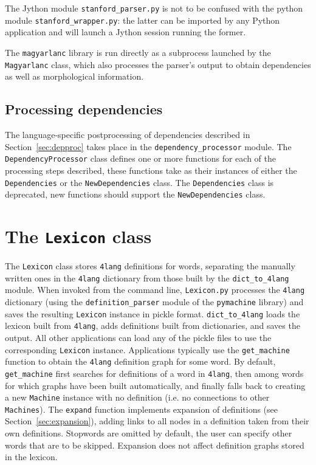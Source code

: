 \documentclass{article}
\newcommand{\difl}{\texttt{dict\_to\_4lang}\xspace}
\newcommand{\fl}{\texttt{4lang}\xspace}
\begin{document}
The Jython module \texttt{stanford\_parser.py}
is not to be confused with the python module \texttt{stanford\_wrapper.py}: the
latter can be imported by any Python application and will launch a Jython
session running the former.

The \texttt{magyarlanc} library is run directly as a subprocess launched by the
\texttt{Magyarlanc} class, which also processes the parser's output to obtain
dependencies as well as morphological information.

\subsection{Processing dependencies}
The language-specific postprocessing of dependencies described in
Section~\ref{sec:depproc} takes place in the \texttt{dependency\_processor}
module. The \texttt{DependencyProcessor} class defines one or more functions
for each of the processing steps described, these functions take as their
instances of either the \texttt{Dependencies} or the \texttt{NewDependencies}
class. The \texttt{Dependencies} class is deprecated, new functions should
support the \texttt{NewDependencies} class.

\section{The \texttt{Lexicon} class}
\label{sec:lexicon}

The \texttt{Lexicon} class stores \fl definitions for words, separating the
manually written ones in the \fl dictionary from those built by the \difl
module. When invoked from the command line, \texttt{Lexicon.py} processes the
\fl dictionary (using the \texttt{definition\_parser} module of the
\texttt{pymachine} library) and saves the resulting \texttt{Lexicon} instance
in pickle format. \difl loads the lexicon built from \fl, adds definitions
built from dictionaries, and saves the output. All other applications can load
any of the pickle files to use the corresponding \texttt{Lexicon} instance.
Applications typically use the \texttt{get\_machine} function to obtain the \fl
definition graph for some word. By default, \texttt{get\_machine} first
searches for definitions of a word in \fl, then among words for which
graphs have been built automatically, and finally falls back to creating a new
\texttt{Machine} instance with no definition (i.e. no connections to other
\texttt{Machines}). The \texttt{expand} function implements expansion of
definitions (see Section~\ref{sec:expansion}), adding links to all nodes in a
definition taken from their own definitions. Stopwords are omitted by default,
the user can specify other words that are to be skipped. Expansion does not
affect definition graphs stored in the lexicon.
\end{document}
